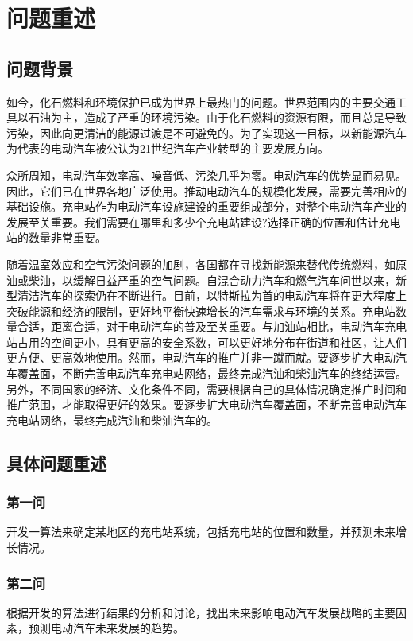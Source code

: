 \documentclass[12pt, a4paper, oneside]{ctexart}
\begin{document}
\begin{abstract}

\end{abstract}
\newpage
\section{问题重述}
\subsection{问题背景}
如今，化石燃料和环境保护已成为世界上最热门的问题。世界范围内的主要交通工具以石油为主，造成了严重的环境污染。由于化石燃料的资源有限，而且总是导致污染，因此向更清洁的能源过渡是不可避免的。为了实现这一目标，以新能源汽车为代表的电动汽车被公认为21世纪汽车产业转型的主要发展方向。

众所周知，电动汽车效率高、噪音低、污染几乎为零。电动汽车的优势显而易见。因此，它们已在世界各地广泛使用。推动电动汽车的规模化发展，需要完善相应的基础设施。充电站作为电动汽车设施建设的重要组成部分，对整个电动汽车产业的发展至关重要。我们需要在哪里和多少个充电站建设?选择正确的位置和估计充电站的数量非常重要。

随着温室效应和空气污染问题的加剧，各国都在寻找新能源来替代传统燃料，如原油或柴油，以缓解日益严重的空气问题。自混合动力汽车和燃气汽车问世以来，新型清洁汽车的探索仍在不断进行。目前，以特斯拉为首的电动汽车将在更大程度上突破能源和经济的限制，更好地平衡快速增长的汽车需求与环境的关系。充电站数量合适，距离合适，对于电动汽车的普及至关重要。与加油站相比，电动汽车充电站占用的空间更小，具有更高的安全系数，可以更好地分布在街道和社区，让人们更方便、更高效地使用。然而，电动汽车的推广并非一蹴而就。要逐步扩大电动汽车覆盖面，不断完善电动汽车充电站网络，最终完成汽油和柴油汽车的终结运营。另外，不同国家的经济、文化条件不同，需要根据自己的具体情况确定推广时间和推广范围，才能取得更好的效果。要逐步扩大电动汽车覆盖面，不断完善电动汽车充电站网络，最终完成汽油和柴油汽车的。
\subsection{具体问题重述}
\subsubsection{第一问}
开发一算法来确定某地区的充电站系统，包括充电站的位置和数量，并预测未来增长情况。

\subsubsection{第二问}
根据开发的算法进行结果的分析和讨论，找出未来影响电动汽车发展战略的主要因素，预测电动汽车未来发展的趋势。
\end{document}
